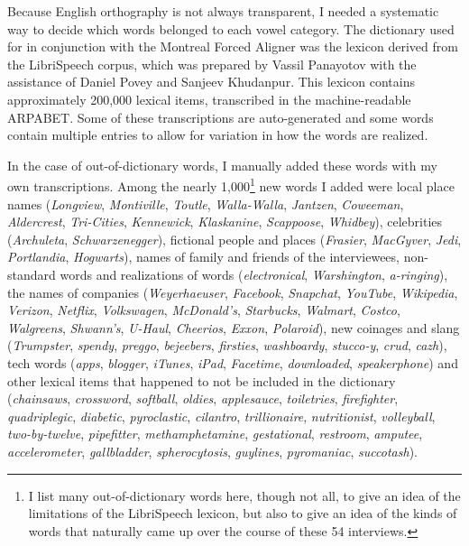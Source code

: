 Because English orthography is not always transparent, I needed a systematic way to decide which words belonged to each vowel category. The dictionary used for in conjunction with the Montreal Forced Aligner was the lexicon derived from the LibriSpeech corpus, which was prepared by Vassil Panayotov with the assistance of Daniel Povey and Sanjeev Khudanpur. This lexicon contains approximately 200,000 lexical items, transcribed in the machine-readable ARPABET. Some of these transcriptions are auto-generated and some words contain multiple entries to allow for variation in how the words are realized.

In the case of out-of-dictionary words, I manually added these words with my own transcriptions. Among the nearly 1,000\footnote{I list many out-of-dictionary words here, though not all, to give an idea of the limitations of the LibriSpeech lexicon, but also to give an idea of the kinds of words that naturally came up over the course of these 54 interviews.} new words I added were local place names (\textit{Longview}, \textit{Montiville}, \textit{Toutle}, \textit{Walla-Walla}, \textit{Jantzen}, \textit{Coweeman}, \textit{Aldercrest}, \textit{Tri-Cities}, \textit{Kennewick}, \textit{Klaskanine}, \textit{Scappoose}, \textit{Whidbey}), celebrities (\textit{Archuleta}, \textit{Schwarzenegger}), fictional people and places (\textit{Frasier}, \textit{MacGyver}, \textit{Jedi}, \textit{Portlandia}, \textit{Hogwarts}), names of family and friends of the interviewees, non-standard words and realizations of words (\textit{electronical}, \textit{Warshington}, \textit{a-ringing}), the names of companies (\textit{Weyerhaeuser}, \textit{Facebook}, \textit{Snapchat}, \textit{YouTube}, \textit{Wikipedia}, \textit{Verizon}, \textit{Netflix}, \textit{Volkswagen}, \textit{McDonald's}, \textit{Starbucks}, \textit{Walmart}, \textit{Costco}, \textit{Walgreens}, \textit{Shwann's}, \textit{U-Haul}, \textit{Cheerios}, \textit{Exxon}, \textit{Polaroid}), new coinages and slang (\textit{Trumpster}, \textit{spendy}, \textit{preggo}, \textit{bejeebers}, \textit{firsties}, \textit{washboardy}, \textit{stucco-y}, \textit{crud}, \textit{cazh}), tech words (\textit{apps}, \textit{blogger}, \textit{iTunes}, \textit{iPad}, \textit{Facetime}, \textit{downloaded}, \textit{speakerphone}) and other lexical items that happened to not be included in the dictionary (\textit{chainsaws}, \textit{crossword}, \textit{softball}, \textit{oldies}, \textit{applesauce}, \textit{toiletries}, \textit{firefighter}, \textit{quadriplegic}, \textit{diabetic}, \textit{pyroclastic}, \textit{cilantro}, \textit{trillionaire}, \textit{nutritionist}, \textit{volleyball}, \textit{two-by-twelve}, \textit{pipefitter}, \textit{methamphetamine}, \textit{gestational},  \textit{restroom}, \textit{amputee}, \textit{accelerometer}, \textit{gallbladder}, \textit{spherocytosis}, \textit{guylines}, \textit{pyromaniac}, \textit{succotash}).

